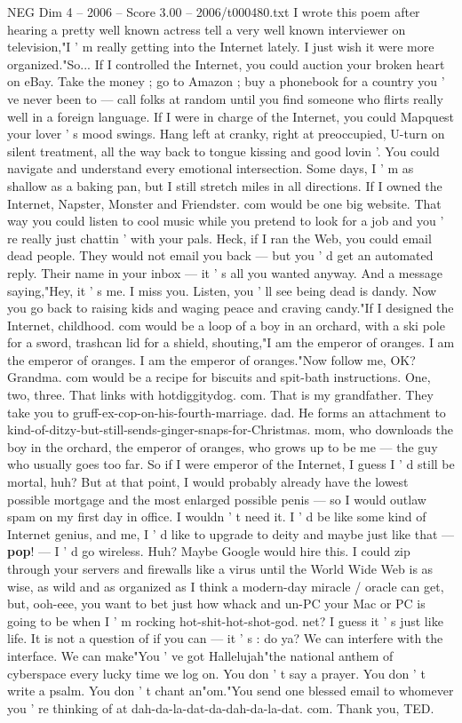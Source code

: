 \begin{textsample}{NEG Dim 4 – 2006 – Score 3.00 – 2006/t000480.txt}  \label{ex:f4_neg_078}
I wrote this poem after hearing a pretty well known actress tell a very well known interviewer on television,"I ' m really getting into the Internet lately.
I just wish it were more organized."So...
If I controlled the Internet, you could auction your broken heart on eBay.
Take the money ; go to Amazon ; buy a phonebook for a country you ' ve never been to — call folks at random until you find someone who flirts really well in a foreign language.
If I were in charge of the Internet, you could Mapquest your lover ' s mood swings.
Hang left at cranky, right at preoccupied, U-turn on silent treatment, all the way back to tongue kissing and good lovin '.
You could navigate and understand every emotional intersection.
Some days, I ' m as shallow as a baking pan, but I still stretch miles in all directions.
If I owned the Internet, Napster, Monster and Friendster. com would be one big website.
That way you could listen to cool music while you pretend to look for a job and you ' re really just chattin ' with your pals.
Heck, if I ran the Web, you could email dead people.
They would not email you back — but you ' d get an automated reply.
Their name in your inbox — it ' s all you wanted anyway.
And a message saying,"Hey, it ' s me.
I miss you.
Listen, you ' ll see being dead is dandy.
Now you go back to raising kids and waging peace and craving candy."If I designed the Internet, childhood. com would be a loop of a boy in an orchard, with a ski pole for a sword, trashcan lid for a shield, shouting,"I am the emperor of oranges.
I am the emperor of oranges.
I am the emperor of oranges."Now follow me, OK?
Grandma. com would be a recipe for biscuits and spit-bath instructions.
One, two, three.
That links with hotdiggitydog. com.
That is my grandfather.
They take you to gruff-ex-cop-on-his-fourth-marriage. dad.
He forms an attachment to kind-of-ditzy-but-still-sends-ginger-snaps-for-Christmas. mom, who downloads the boy in the orchard, the emperor of oranges, who grows up to be me — the guy who usually goes too far.
So if I were emperor of the Internet, I guess I ' d still be mortal, huh?
But at that point, I would probably already have the lowest possible mortgage and the most enlarged possible penis — so I would outlaw spam on my first day in office.
I wouldn ' t need it.
I ' d be like some kind of Internet genius, and me, I ' d like to upgrade to deity and maybe just like that — \textbf{pop}! — I ' d go wireless.
Huh?
Maybe Google would hire this.
I could zip through your servers and firewalls like a virus until the World Wide Web is as wise, as wild and as organized as I think a modern-day miracle / oracle can get, but, ooh-eee, you want to bet just how whack and un-PC your Mac or PC is going to be when I ' m rocking hot-shit-hot-shot-god. net?
I guess it ' s just like life.
It is not a question of if you can — it ' s : do ya?
We can interfere with the interface.
We can make"You ' ve got Hallelujah"the national anthem of cyberspace every lucky time we log on.
You don ' t say a prayer.
You don ' t write a psalm.
You don ' t chant an"om."You send one blessed email to whomever you ' re thinking of at dah-da-la-dat-da-dah-da-la-dat. com.
Thank you, TED.

\end{textsample}
